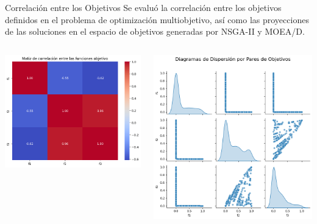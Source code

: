 \documentclass[aspectratio=169,xcolor=dvipsnames]{beamer}
\begin{document}
\begin{frame}{Correlación entre los Objetivos}
    Se evaluó la correlación entre los objetivos definidos en el problema de optimización multiobjetivo, así como las proyecciones de las soluciones en el espacio de objetivos generadas por NSGA-II y MOEA/D.
    
    \begin{columns}
        \centering
        \includegraphics[width=\textwidth]{img/correlation_matrix.png} %
        
        \centering
        \includegraphics[width=\textwidth]{img/pareto_projection_nsga2.png} %
        

\end{columns}
\end{frame}
\end{document}
